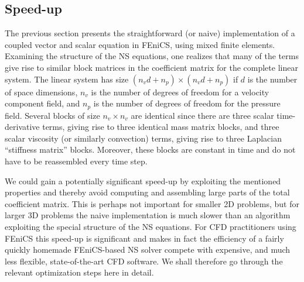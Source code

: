 \subsection{Speed-up}
\label{sec:mortensen:speed-up}

The previous section presents the straightforward (or naive)
implementation of a coupled vector and scalar equation in FEniCS,
using mixed finite elements.  Examining the structure of the NS
equations, one realizes that many of the terms give rise to similar
block matrices in the coefficient matrix for the complete linear
system. The linear system has size $(n_vd+n_p)\times (n_vd+n_p)$ if
$d$ is the number of space dimensions, $n_v$ is the number of degrees
of freedom for a velocity component field, and $n_p$ is the number of
degrees of freedom for the pressure field.  Several blocks of size
$n_v\times n_v$ are identical since there are three scalar
time-derivative terms, giving rise to three identical mass matrix
blocks, and three scalar viscosity (or similarly convection) terms,
giving rise to three Laplacian ``stiffness matrix'' blocks.  Moreover,
these blocks are constant in time and do not have to be reassembled
every time step.

We could gain a potentially significant speed-up by exploiting the
mentioned properties and thereby avoid computing and assembling large
parts of the total coefficient matrix. This is perhaps not important
for smaller 2D problems, but for larger 3D problems the naive
implementation is much slower than an algorithm exploiting the special
structure of the NS equations.  For CFD practitioners using FEniCS
this speed-up is significant and makes in fact the efficiency of a
fairly quickly homemade FEniCS-based NS solver compete with expensive,
and much less flexible, state-of-the-art CFD software.  We shall
therefore go through the relevant optimization steps here in detail.

